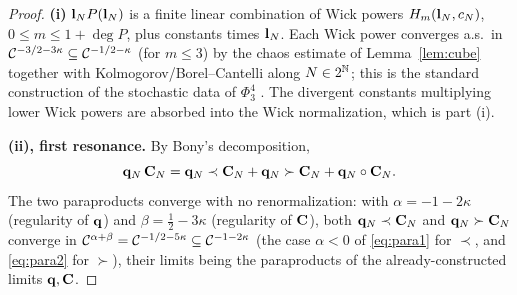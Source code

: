 \begin{proof}
\textbf{(i)} $\mathbf{l}_N P(\mathbf{l}_N)$ is a finite linear combination of Wick powers
$H_{m}(\mathbf{l}_N,c_N)$, $0\le m\le 1+\deg P$, plus constants times $\mathbf{l}_N$.
Each Wick power converges a.s.\ in $\mathcal{C}^{-3/2-3\kappa}\subseteq\mathcal{C}^{-1/2-\kappa}$
(for $m\le3$) by the chaos estimate of Lemma~\ref{lem:cube} together with
Kolmogorov/Borel--Cantelli along $N\in2^{\mathbb{N}}$; this is the standard construction of
the stochastic data of $\Phi^4_3$ \cite{CC18}. The divergent constants multiplying
lower Wick powers are absorbed into the Wick normalization, which is part (i).

\medskip
\textbf{(ii), first resonance.} By Bony's decomposition,
\begin{equation}\label{eq:bony1}
\mathbf{q}_N\,\mathbf{C}_N=\mathbf{q}_N\prec\mathbf{C}_N+\mathbf{q}_N\succ\mathbf{C}_N+\mathbf{q}_N\circ\mathbf{C}_N .
\end{equation}
The two paraproducts converge with no renormalization: with $\alpha=-1-2\kappa$
(regularity of $\mathbf{q}$) and $\beta=\tfrac12-3\kappa$ (regularity of $\mathbf{C}$),
both $\mathbf{q}_N\prec\mathbf{C}_N$ and $\mathbf{q}_N\succ\mathbf{C}_N$ converge in
$\mathcal{C}^{\alpha+\beta}=\mathcal{C}^{-1/2-5\kappa}\subseteq\mathcal{C}^{-1-2\kappa}$ (the case $\alpha<0$ of
\eqref{eq:para1} for $\prec$, and \eqref{eq:para2} for $\succ$), their limits being the paraproducts of the
already-constructed limits $\mathbf{q},\mathbf{C}$.


\end{proof}

